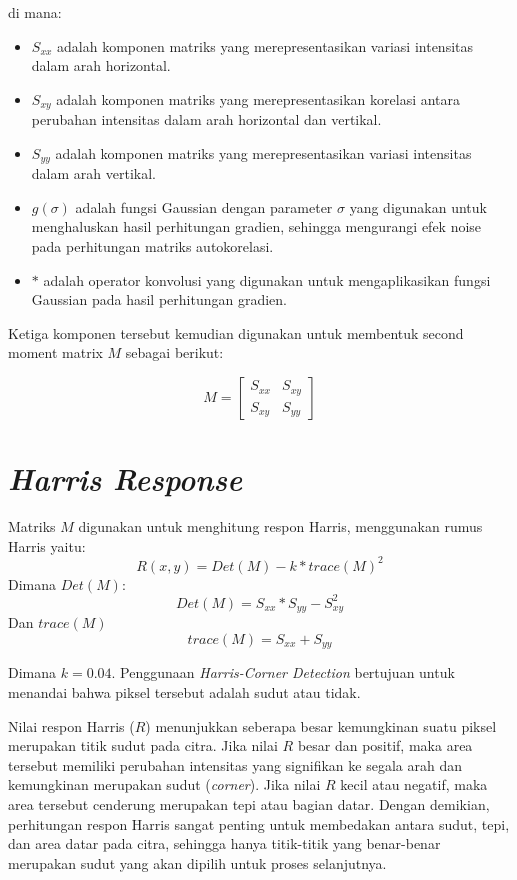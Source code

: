 di mana:
\begin{itemize}
    \item \(S_{xx}\) adalah komponen matriks yang merepresentasikan variasi intensitas dalam arah horizontal.
    \item \(S_{xy}\) adalah komponen matriks yang merepresentasikan korelasi antara perubahan intensitas dalam arah horizontal dan vertikal.
    \item \(S_{yy}\) adalah komponen matriks yang merepresentasikan variasi intensitas dalam arah vertikal.
    \item \(g(\sigma)\) adalah fungsi Gaussian dengan parameter \(\sigma\) yang digunakan untuk menghaluskan hasil perhitungan gradien, sehingga mengurangi efek noise pada perhitungan matriks autokorelasi.
    \item \(*\) adalah operator konvolusi yang digunakan untuk mengaplikasikan fungsi Gaussian pada hasil perhitungan gradien.
\end{itemize} 
Ketiga komponen tersebut kemudian digunakan untuk membentuk second moment matrix \(M\) sebagai berikut:

\begin{equation}
    M = 
    \begin{bmatrix}
        S_{xx} & S_{xy} \\
        S_{xy} & S_{yy}
    \end{bmatrix} 
\end{equation}

\section{\emph{Harris Response}}
    Matriks \(M\) digunakan untuk menghitung respon Harris, menggunakan rumus Harris yaitu:
\begin{equation}
    R(x,y) = Det(M) - k * {trace(M)}^2
\end{equation}
Dimana \(Det(M)\):
\begin{equation*}
    Det(M) = S_{xx} * S_{yy} - S_{xy}^2
\end{equation*}
Dan \(trace(M)\) 
\begin{equation*}
    trace(M) = S_{xx} + S_{yy}
\end{equation*}

    Dimana \(k = 0.04\). Penggunaan \emph{Harris-Corner Detection} bertujuan untuk menandai bahwa piksel tersebut adalah sudut atau tidak.

    Nilai respon Harris (\(R\)) menunjukkan seberapa besar kemungkinan suatu piksel merupakan titik sudut pada citra. Jika nilai \(R\) besar dan positif, maka area tersebut memiliki perubahan intensitas yang signifikan ke segala arah dan kemungkinan merupakan sudut (\emph{corner}). Jika nilai \(R\) kecil atau negatif, maka area tersebut cenderung merupakan tepi atau bagian datar. Dengan demikian, perhitungan respon Harris sangat penting untuk membedakan antara sudut, tepi, dan area datar pada citra, sehingga hanya titik-titik yang benar-benar merupakan sudut yang akan dipilih untuk proses selanjutnya.

